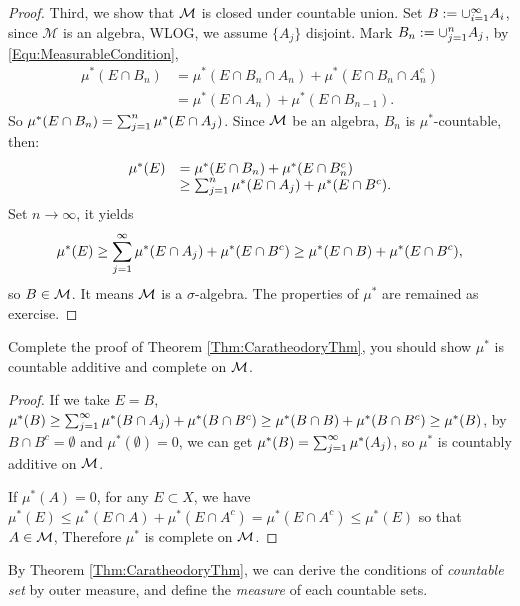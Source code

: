\begin{proof}
    Third, we show that $\mathcal{M}$ is closed under countable union. 
    Set $B:=\cup_{i=1}^{\infty}A_{i}$, since $\mathcal{M}$ is an algebra, 
    WLOG, we assume $\{A_{j}\}$ disjoint. Mark $B_{n}:=\cup_{j=1}^{n}A_j$, 
    by \eqref{Equ:MeasurableCondition}, 
    \begin{displaymath}
        \begin{array}{rl}
        \mu^{*}(E\cap B_n)&=\mu^{*}(E\cap B_{n}\cap A_{n})+
        \mu^{*}(E\cap B_n\cap A_n^c)\\
        &=\mu^{*}(E\cap A_n)+\mu^{*}(E\cap B_{n-1}).
        \end{array}
    \end{displaymath}
    So $\mu^{*}(E\cap B_n)=\sum_{j=1}^{n}\mu^{*}(E\cap A_j)$. Since $\mathcal{M}$ 
    be an algebra, $B_{n}$ is $\mu^{*}$-countable, then:
    \begin{displaymath}
        \begin{array}{rl}
            \mu^{*}(E)&=\mu^{*}(E\cap B_n)+\mu^{*}(E\cap B_{n}^{c})\\
            &\ge\sum_{j=1}^{n}\mu^{*}(E\cap A_j)+\mu^{*}(E\cap B^c).\\
        \end{array}
    \end{displaymath}
    Set $n\rightarrow\infty$, it yields 
    \begin{displaymath}
        \mu^{*}(E)\ge\sum_{j=1}^{\infty}\mu^{*}(E\cap A_j)+\mu^{*}(E\cap B^c)
        \ge\mu^{*}(E\cap B)+\mu^{*}(E\cap B^c),
    \end{displaymath}
    so $B\in\mathcal{M}$. It means $\mathcal{M}$ is a $\sigma$-algebra. 
    The properties of $\mu^{*}$ are remained as exercise.
\end{proof}
\begin{exc}
    Complete the proof of Theorem \ref{Thm:CaratheodoryThm}, 
    you should show $\mu^{*}$ is countable additive 
    and complete on $\mathcal{M}$.
\end{exc}
\begin{proof}
    If we take $E=B$, $\mu^{*}(B)\ge\sum_{j=1}^{\infty}\mu^{*}(B\cap A_j)+\mu^{*}(B\cap B^c)
    \ge\mu^{*}(B\cap B)+\mu^{*}(B\cap B^c)\ge\mu^{*}(B)$, by $B\cap B^c=\emptyset$ and 
    $\mu^{*}(\emptyset)=0$, we can get $\mu^{*}(B)=\sum_{j=1}^{\infty}\mu^{*}(A_j)$, so 
    $\mu^{*}$ is countably additive on $\mathcal{M}$.

    If $\mu^{*}(A)=0$, for any $E\subset X$, we have $\mu^{*}(E)\leq\mu^{*}(E\cap A)+
    \mu^{*}(E\cap A^c)=\mu^{*}(E\cap A^c)\leq \mu^{*}(E)$ so that $A\in\mathcal{M}$, Therefore
    $\mu^{*}$ is complete on $\mathcal{M}$.
\end{proof}
\begin{rem}
    By Theorem \ref{Thm:CaratheodoryThm}, we can derive the conditions 
    of \textit{countable set} by outer measure, and 
    define the \textit{measure} of each countable sets.
\end{rem}
